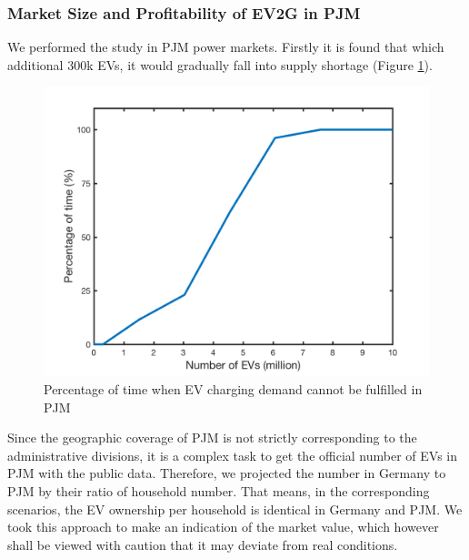 \subsubsection{Market Size and Profitability of EV2G  in PJM}
We performed the study in PJM power markets. Firstly it is found that which additional 300k EVs, it would gradually fall into supply shortage (Figure \ref{fig:EV_nan_percentageg-PJM}).

\begin{figure}[h!]
	\centering
	\includegraphics[width=0.95\linewidth]{Figures/EV_nan_percentage_PJM}
	\caption{Percentage of time when EV charging demand cannot be fulfilled in PJM}
	\label{fig:EV_nan_percentageg-PJM}
\end{figure}

Since the geographic coverage of PJM is not strictly corresponding to the administrative divisions, it is a complex task to get the official number of EVs in PJM with the public data. Therefore, we projected the number in Germany to PJM by their ratio of household number. That means, in the corresponding scenarios, the EV ownership per household is identical in Germany and PJM. We took this approach to make an indication of the market value, which however shall be viewed with caution that it may deviate from real conditions.

